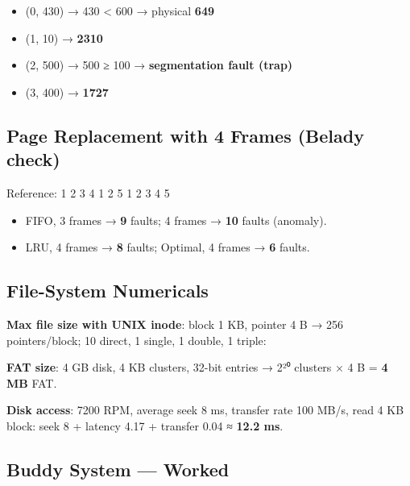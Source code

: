\endgroup

\begin{itemize}
\tightlist
\item
  (0, 430) → 430 \textless{} 600 → physical \textbf{649}
\item
  (1, 10) → \textbf{2310}
\item
  (2, 500) → 500 ≥ 100 → \textbf{segmentation fault (trap)}
\item
  (3, 400) → \textbf{1727}
\end{itemize}

\needspace{125pt}

\hypertarget{p2-05--145-page-replacement-with-4-frames-belady-check}{%
\subsection{Page Replacement with 4 Frames (Belady check)}\label{p2-05--145-page-replacement-with-4-frames-belady-check}}

Reference: 1 2 3 4 1 2 5 1 2 3 4 5

\begin{itemize}
\tightlist
\item
  FIFO, 3 frames → \textbf{9} faults; 4 frames → \textbf{10} faults (anomaly).
\item
  LRU, 4 frames → \textbf{8} faults; Optimal, 4 frames → \textbf{6} faults.
\end{itemize}

\needspace{125pt}

\hypertarget{p2-05--146-file-system-numericals}{%
\subsection{File-System Numericals}\label{p2-05--146-file-system-numericals}}

\textbf{Max file size with UNIX inode}: block 1 KB, pointer 4 B → 256 pointers/block; 10 direct, 1 single, 1 double, 1 triple:



\textbf{FAT size}: 4 GB disk, 4 KB clusters, 32-bit entries → 2²⁰ clusters × 4 B = \textbf{4 MB} FAT.

\textbf{Disk access}: 7200 RPM, average seek 8 ms, transfer rate 100 MB/s, read 4 KB block:
seek 8 + latency 4.17 + transfer 0.04 ≈ \textbf{12.2 ms}.

\needspace{125pt}

\hypertarget{p2-05--147-buddy-system--worked}{%
\subsection{Buddy System --- Worked}\label{p2-05--147-buddy-system--worked}}

